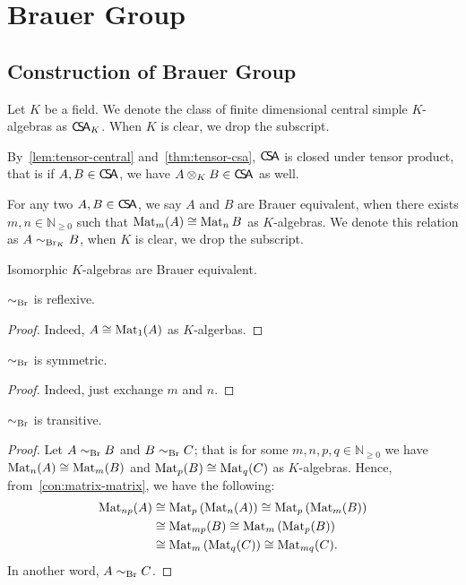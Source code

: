 \chapter{Brauer Group}\label{cha:brauer-group}

\section{Construction of Brauer Group}
Let $K$ be a field. We denote the class of finite dimensional central simple $K$-algebras as $\operatorname{\mathsf{C}\!\mathsf{S}\!\mathsf{A}}_{K}$. When $K$ is clear, we drop the subscript.

\begin{remark}
  By~\cref{lem:tensor-central} and~\cref{thm:tensor-csa}, $\operatorname{\mathsf{C}\!\mathsf{S}\!\mathsf{A}}$ is closed under tensor product, that is if $A, B\in\operatorname{\mathsf{C}\!\mathsf{S}\!\mathsf{A}}$, we have $A\otimes_{K} B\in\operatorname{\mathsf{C}\!\mathsf{S}\!\mathsf{A}}$ as well.
\end{remark}

\begin{definition}
  For any two $A, B\in\operatorname{\mathsf{C}\!\mathsf{S}\!\mathsf{A}}$, we say $A$ and $B$ are Brauer equivalent, when there exists $m, n \in \mathbb{N}_{\ge0}$ such that $\operatorname{Mat}_{m}(A)\cong \operatorname{Mat}_{n}B$ as $K$-algebras. We denote this relation as $A\sim_{\operatorname{Br}_{K}} B$, when $K$ is clear, we drop the subscript.
\end{definition}

\begin{remark}
  Isomorphic $K$-algebras are Brauer equivalent.
\end{remark}

\begin{lemma}
  $\sim_{\operatorname{Br}}$ is reflexive.
  \leanok
\end{lemma}
\begin{proof}
  Indeed, $A \cong \operatorname{Mat}_{1}(A)$ as $K$-algerbas.
\end{proof}

\begin{lemma}
  $\sim_{\operatorname{Br}}$ is symmetric.
  \leanok
\end{lemma}
\begin{proof}
  Indeed, just exchange $m$ and $n$.
\end{proof}

\begin{lemma}
  $\sim_{\operatorname{Br}}$ is transitive.
  \leanok
\end{lemma}
\begin{proof}
  Let $A\sim_{\operatorname{Br}}B$ and $B\sim_{\operatorname{Br}}C$; that is for some $m,n,p, q\in\mathbb{N}_{\ge0}$ we have $\operatorname{Mat}_{n}(A)\cong\operatorname{Mat}_{m}(B)$ and $\operatorname{Mat}_{p}(B)\cong \operatorname{Mat}_{q}(C)$ as $K$-algebras. Hence, from~\cref{con:matrix-matrix}, we have the following:
  \[
    \begin{aligned}
      \operatorname{Mat}_{np}(A)&\cong \operatorname{Mat}_{p}\left(\operatorname{Mat}_{n}(A)\right)\cong\operatorname{Mat}_{p}\left(\operatorname{Mat}_{m}(B)\right)\\
                  &\cong\operatorname{Mat}_{mp}(B)\cong\operatorname{Mat}_{m}\left(\operatorname{Mat}_{p}(B)\right)\\
      &\cong\operatorname{Mat}_{m}\left(\operatorname{Mat}_{q}(C)\right)\cong\operatorname{Mat}_{mq}(C).
    \end{aligned}
  \]
  In another word, $A\sim_{\operatorname{Br}}C$.
\end{proof}

